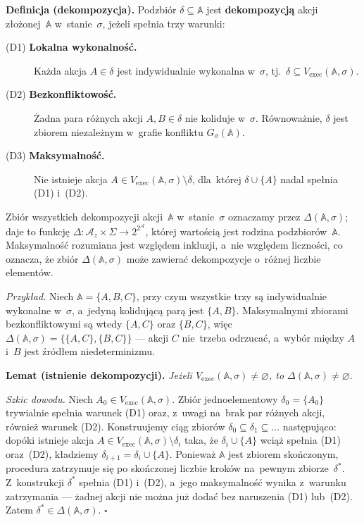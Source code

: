 \documentclass[11pt,a4paper]{article}
\theoremstyle{definition}
\begin{document}
\medskip
\noindent \textbf{Definicja (dekompozycja).}
Podzbiór $\delta \subseteq \mathbb{A}$ jest \textbf{dekompozycją} akcji
złożonej~$\mathbb{A}$ w~stanie~$\sigma$, jeżeli spełnia trzy warunki:
\begin{description}
  \item[(D1) \textbf{Lokalna wykonalność.}]
        Każda akcja $A \in \delta$ jest indywidualnie wykonalna w~$\sigma$,
        tj.\ $\delta \subseteq V_{\mathrm{exec}}(\mathbb{A},\sigma)$.
  \item[(D2) \textbf{Bezkonfliktowość.}]
        Żadna para różnych akcji $A, B \in \delta$ nie koliduje w~$\sigma$.
        Równoważnie, $\delta$ jest zbiorem niezależnym w~grafie konfliktu
        $G_\sigma(\mathbb{A})$.
  \item[(D3) \textbf{Maksymalność.}]
        Nie istnieje akcja $A \in V_{\mathrm{exec}}(\mathbb{A},\sigma) \setminus \delta$,
        dla~której $\delta \cup \{A\}$ nadal spełnia (D1) i~(D2).
\end{description}
Zbiór wszystkich dekompozycji akcji~$\mathbb{A}$ w~stanie~$\sigma$
oznaczamy przez $\Delta(\mathbb{A},\sigma)$; daje to funkcję
$\Delta : \mathcal{A}_z \times \Sigma \to 2^{2^{\mathcal{A}}}$, której wartością jest rodzina
podzbiorów~$\mathbb{A}$. Maksymalność rozumiana jest
względem inkluzji, a~nie względem liczności, co oznacza, że zbiór
$\Delta(\mathbb{A},\sigma)$ może zawierać dekompozycje o~różnej liczbie
elementów.

\smallskip\noindent\emph{Przykład.}
Niech $\mathbb{A}=\{A,B,C\}$, przy czym wszystkie trzy są indywidualnie wykonalne
w~$\sigma$, a~jedyną kolidującą parą jest $\{A,B\}$. Maksymalnymi zbiorami
bezkonfliktowymi są wtedy $\{A,C\}$ oraz $\{B,C\}$, więc
$\Delta(\mathbb{A},\sigma)=\{\{A,C\},\{B,C\}\}$ --- akcji $C$ nie~trzeba odrzucać,
a~wybór między $A$ i~$B$ jest źródłem niedeterminizmu.

\medskip
\noindent \textbf{Lemat (istnienie dekompozycji).}
\emph{Jeżeli $V_{\mathrm{exec}}(\mathbb{A},\sigma) \neq \varnothing$, to
$\Delta(\mathbb{A},\sigma) \neq \varnothing$.}

\medskip
\noindent \textit{Szkic dowodu.}
Niech $A_0 \in V_{\mathrm{exec}}(\mathbb{A},\sigma)$. Zbiór jednoelementowy
$\delta_0 = \{A_0\}$ trywialnie spełnia warunek (D1) oraz, z~uwagi na~brak
par różnych akcji, również warunek (D2). Konstruujemy ciąg zbiorów
$\delta_0 \subseteq \delta_1 \subseteq \ldots$ następująco: dopóki
istnieje akcja $A \in V_{\mathrm{exec}}(\mathbb{A},\sigma) \setminus \delta_i$
taka, że $\delta_i \cup \{A\}$ wciąż spełnia (D1) oraz~(D2), kładziemy
$\delta_{i+1} = \delta_i \cup \{A\}$. Ponieważ $\mathbb{A}$ jest zbiorem
skończonym, procedura zatrzymuje się po skończonej liczbie kroków
na~pewnym zbiorze~$\delta^\ast$. Z~konstrukcji $\delta^\ast$ spełnia
(D1) i~(D2), a~jego maksymalność wynika z~warunku zatrzymania ---
żadnej akcji nie można już dodać bez naruszenia (D1) lub~(D2). Zatem
$\delta^\ast \in \Delta(\mathbb{A},\sigma)$. \hfill$\square$
\end{document}
